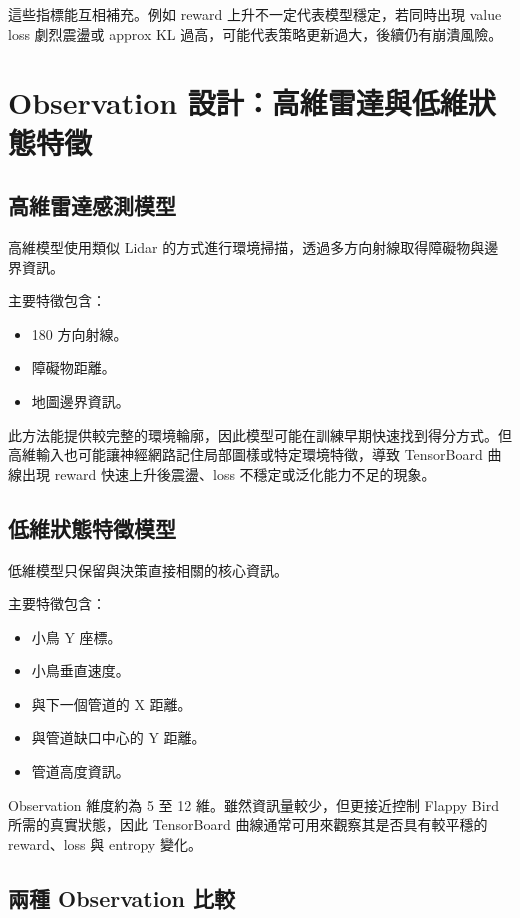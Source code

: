 \documentclass[12pt,a4paper]{ctexart}
\begin{document}
這些指標能互相補充。例如 reward 上升不一定代表模型穩定，若同時出現 value loss 劇烈震盪或 approx KL 過高，可能代表策略更新過大，後續仍有崩潰風險。

\section{Observation 設計：高維雷達與低維狀態特徵}

\subsection{高維雷達感測模型}

高維模型使用類似 Lidar 的方式進行環境掃描，透過多方向射線取得障礙物與邊界資訊。

主要特徵包含：

\begin{itemize}
  \item 180 方向射線。
  \item 障礙物距離。
  \item 地圖邊界資訊。
\end{itemize}

此方法能提供較完整的環境輪廓，因此模型可能在訓練早期快速找到得分方式。但高維輸入也可能讓神經網路記住局部圖樣或特定環境特徵，導致 TensorBoard 曲線出現 reward 快速上升後震盪、loss 不穩定或泛化能力不足的現象。

\subsection{低維狀態特徵模型}

低維模型只保留與決策直接相關的核心資訊。

主要特徵包含：

\begin{itemize}
  \item 小鳥 Y 座標。
  \item 小鳥垂直速度。
  \item 與下一個管道的 X 距離。
  \item 與管道缺口中心的 Y 距離。
  \item 管道高度資訊。
\end{itemize}

Observation 維度約為 5 至 12 維。雖然資訊量較少，但更接近控制 Flappy Bird 所需的真實狀態，因此 TensorBoard 曲線通常可用來觀察其是否具有較平穩的 reward、loss 與 entropy 變化。

\subsection{兩種 Observation 比較}
\end{document}
